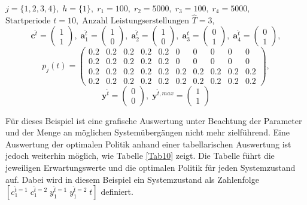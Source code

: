 {\begin{center}
$j = \{1, 2, 3, 4\}, \; h = \{1\}, \; r_{1} = 100, \; r_{2} = 5000, \; r_{3} = 100, \; r_{4} = 5000,$ \\
$\text{Startperiode } t=10, \; \text{Anzahl Leistungserstellungen } \hat{T}= 3  $,
\[\textbf{c}^{\hat{t}}=\begin{pmatrix} 1\\ 1  \end{pmatrix}, \;
    \textbf{a}^{\hat t}_1=\begin{pmatrix} 1\\ 0  \end{pmatrix}, \;
\textbf{a}^{\hat t}_2=\begin{pmatrix} 1\\ 0  \end{pmatrix}, \;
\textbf{a}^{\hat t}_3=\begin{pmatrix} 0\\ 1  \end{pmatrix}, \;
\textbf{a}^{\hat t}_4=\begin{pmatrix} 0\\ 1  \end{pmatrix}, \]
         \[ p_{j}(t)=
       \begin{pmatrix}
       0.2 & 0.2 & 0.2 & 0.2 & 0.2 & 0 & 0 & 0 & 0 & 0\\
       0.2 & 0.2 & 0.2 & 0.2 & 0.2 & 0 & 0 & 0 & 0 & 0\\
       0.2 & 0.2 & 0.2 & 0.2 & 0.2 & 0.2 & 0.2 & 0.2 & 0.2 & 0.2\\
       0.2 & 0.2 & 0.2 & 0.2 & 0.2 & 0.2 & 0.2 & 0.2 & 0.2 & 0.2
\end{pmatrix}, 
  \]
  \[
    \textbf{y}^{\hat t}= \begin{pmatrix} 0\\ 0\end{pmatrix}, \;
    \textbf{y}^{\hat t, max}=\begin{pmatrix} 1\\ 1  \end{pmatrix}
      \]
\end{center}}

Für dieses Beispiel ist eine grafische Auswertung unter Beachtung der Parameter und der Menge an möglichen Systemübergängen nicht mehr zielführend. Eine Auswertung der optimalen Politik anhand einer tabellarischen Auswertung ist jedoch weiterhin möglich, wie Tabelle \ref{Tab10} zeigt. Die Tabelle führt die jeweiligen Erwartungswerte und die optimalen Politik für jeden Systemzustand auf. Dabei wird in diesem Beispiel ein Systemzustand als Zahlenfolge $[c_1^{\hat t=1}\;c_1^{\hat t=2}\;y_1^{\hat t=1}\;y_1^{\hat t=2}\;t]$ definiert.

